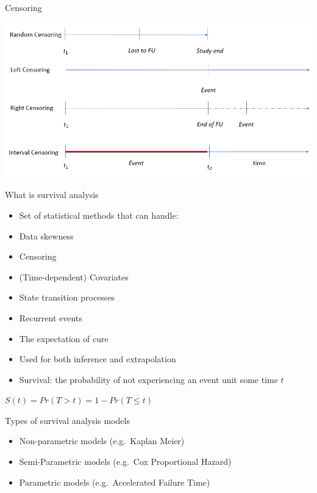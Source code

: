 \documentclass[ignorenonframetext,]{beamer}
\providecommand{\tightlist}{%
  \setlength{\itemsep}{0pt}\setlength{\parskip}{0pt}}
\begin{document}
\begin{frame}{Censoring}

\includegraphics[width=1\linewidth]{figures/censoring}

\end{frame}

\begin{frame}{What is survival analysis}

\begin{itemize}
\item
  Set of statistical methods that can handle:
\item
  Data skewness
\item
  Censoring
\item
  (Time-dependent) Covariates
\item
  State transition processes
\item
  Recurrent events
\item
  The expectation of cure
\item
  Used for both inference and extrapolation
\item
  Survival: the probability of not experiencing an event unit some time
  \(t\)
\end{itemize}

\(S(t) = Pr(T >t) = 1- Pr(T \leq t)\)

\end{frame}

\begin{frame}{Types of survival analysis models}

\begin{itemize}
\tightlist
\item
  Non-parametric models (e.g.~Kaplan Meier)
\item
  Semi-Parametric models (e.g.~Cox Proportional Hazard)
\item
  Parametric models (e.g.~Accelerated Failure Time)
\end{itemize}

\end{frame}
\end{document}
